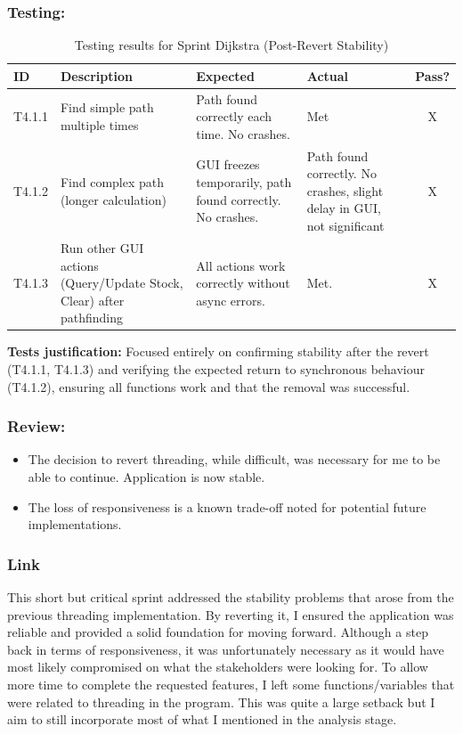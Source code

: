 \subsubsection{Testing:}
\begin{table}[htbp]
	\centering
	\begin{tabularx}{\textwidth}{|l|X|p{3.5cm}|p{3.5cm}|c|}
		\hline
		\textbf{ID} & \textbf{Description} & \textbf{Expected} & \textbf{Actual} & \textbf{Pass?} \\
		\hline
		T4.1.1 & Find simple path multiple times & Path found correctly each time. No crashes. & Met & X \\
		\hline
		T4.1.2 & Find complex path (longer calculation) & GUI freezes temporarily, path found correctly. No crashes. & Path found correctly. No crashes, slight delay in GUI, not significant & X \\
		\hline
		T4.1.3 & Run other GUI actions (Query/Update Stock, Clear) after pathfinding & All actions work correctly without async errors. & Met. & X \\
		\hline
	\end{tabularx}
	\caption{Testing results for Sprint Dijkstra (Post-Revert Stability)}
\end{table}
\textbf{Tests justification:} Focused entirely on confirming stability after the revert (T4.1.1, T4.1.3) and verifying the expected return to synchronous behaviour (T4.1.2), ensuring all functions work and that the removal was successful.

\subsubsection{Review:}
\begin{itemize}
	\item The decision to revert threading, while difficult, was necessary for me to be able to continue. Application is now stable.
	\item The loss of responsiveness is a known trade-off noted for potential future implementations.

\end{itemize}

\subsubsection{Link}
This short but critical sprint addressed the stability problems that arose from the previous threading implementation. By reverting it, I ensured the application was reliable and provided a solid foundation for moving forward. Although a step back in terms of responsiveness, it was unfortunately necessary as it would have most likely compromised on what the stakeholders were looking for. To allow more time to complete the requested features, I left some functions/variables that were related to threading in the program. This was quite a large setback but I aim to still incorporate most of what I mentioned in the analysis stage.

